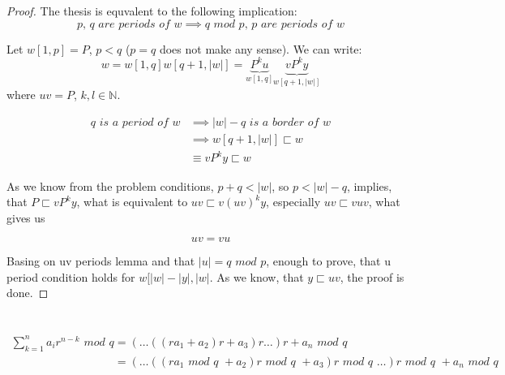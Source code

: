 \documentclass{scrartcl}
\begin{document}
  \section{}
    \begin{proof}
      The thesis is equvalent to the following implication:
      \[\textit{p, q are periods of } w \implies \textit{q mod p, p are periods of w}\]
      
      Let $w[1, p] = P$, $p < q$ ($p = q$ does not make any sense). We can write:
      \[w = w[1, q]w[q + 1, |w|] = \underbrace{P^ku}_{w[1, q]}\underbrace{vP^ky}_{w[q + 1, |w|]}\]
      where $uv = P$, $k,l \in \mathbb{N}$.
      
      \begin{equation}
        \begin{split}
          q \textit{ is a period of } w &\implies |w| - q \textit{ is a border of } w \\ &\implies
          w[q + 1, |w|] \sqsubset w \\ &\equiv vP^ky \sqsubset w
        \end{split}
      \end{equation}
      
      As we know from the problem conditions, $p + q < |w|$, so $p < |w| - q$, implies, that $P \sqsubset vP^ky$, what is equivalent to $uv \sqsubset v(uv)^ky$, especially $uv \sqsubset vuv$, what gives us
      
      \begin{equation}
        uv = vu
      \end{equation}
      
      Basing on uv periods lemma and that $|u| = \textit{q mod p}$, enough to prove, that u period condition holds for $w[|w| - |y|, |w|$. As we know, that $y \sqsubset uv$, the proof is done.
    \end{proof}
    
    \section{}
    \section{}
    \section{}
    \section{}
      \begin{equation}
        \begin{split}
          \sum_{k=1}^n a_ir^{n-k} \textit{ mod q} &= (\dots((ra_1 + a_2)r + a_3)r \dots)r + a_n \textit{ mod q} \\ &= (\dots((ra_1 \textit{ mod q } + a_2)r \textit{ mod q } + a_3)r \textit{ mod q } \dots)r \textit{ mod q } + a_n 
\textit{ mod q }
        \end{split}
      \end{equation}
      
\end{document}
